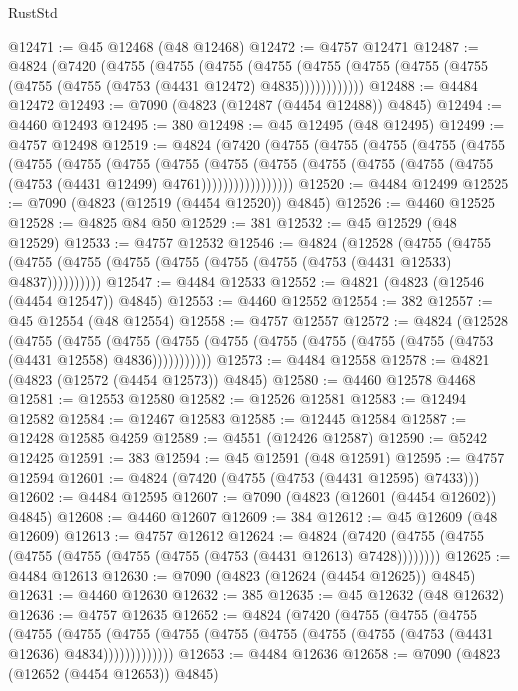 \begin{lexlean}{RustStd}
\begin{coremodule}
@12471 := @45 @12468 (@48 @12468)
@12472 := @4757 @12471
@12487 := @4824
    (@7420
      (@4755
        (@4755
          (@4755
            (@4755 (@4755 (@4755 (@4755 (@4755 (@4755 (@4755 (@4753 (@4431 @12472) @4835))))))))))))
@12488 := @4484 @12472
@12493 := @7090 (@4823 (@12487 (@4454 @12488)) @4845)
@12494 := @4460 @12493
@12495 := 380
@12498 := @45 @12495 (@48 @12495)
@12499 := @4757 @12498
@12519 := @4824
    (@7420
      (@4755
        (@4755
          (@4755
            (@4755
              (@4755
                (@4755
                  (@4755
                    (@4755
                      (@4755
                        (@4755
                          (@4755
                            (@4755 (@4755 (@4755 (@4755 (@4753 (@4431 @12499) @4761)))))))))))))))))
@12520 := @4484 @12499
@12525 := @7090 (@4823 (@12519 (@4454 @12520)) @4845)
@12526 := @4460 @12525
@12528 := @4825 @84 @50
@12529 := 381
@12532 := @45 @12529 (@48 @12529)
@12533 := @4757 @12532
@12546 := @4824
    (@12528
      (@4755 (@4755 (@4755 (@4755 (@4755 (@4755 (@4755 (@4755 (@4753 (@4431 @12533) @4837))))))))))
@12547 := @4484 @12533
@12552 := @4821 (@4823 (@12546 (@4454 @12547)) @4845)
@12553 := @4460 @12552
@12554 := 382
@12557 := @45 @12554 (@48 @12554)
@12558 := @4757 @12557
@12572 := @4824
    (@12528
      (@4755
        (@4755
          (@4755 (@4755 (@4755 (@4755 (@4755 (@4755 (@4755 (@4753 (@4431 @12558) @4836)))))))))))
@12573 := @4484 @12558
@12578 := @4821 (@4823 (@12572 (@4454 @12573)) @4845)
@12580 := @4460 @12578 @4468
@12581 := @12553 @12580
@12582 := @12526 @12581
@12583 := @12494 @12582
@12584 := @12467 @12583
@12585 := @12445 @12584
@12587 := @12428 @12585 @4259
@12589 := @4551 (@12426 @12587)
@12590 := @5242 @12425
@12591 := 383
@12594 := @45 @12591 (@48 @12591)
@12595 := @4757 @12594
@12601 := @4824 (@7420 (@4755 (@4753 (@4431 @12595) @7433)))
@12602 := @4484 @12595
@12607 := @7090 (@4823 (@12601 (@4454 @12602)) @4845)
@12608 := @4460 @12607
@12609 := 384
@12612 := @45 @12609 (@48 @12609)
@12613 := @4757 @12612
@12624 := @4824 (@7420 (@4755 (@4755 (@4755 (@4755 (@4755 (@4755 (@4753 (@4431 @12613) @7428))))))))
@12625 := @4484 @12613
@12630 := @7090 (@4823 (@12624 (@4454 @12625)) @4845)
@12631 := @4460 @12630
@12632 := 385
@12635 := @45 @12632 (@48 @12632)
@12636 := @4757 @12635
@12652 := @4824
    (@7420
      (@4755
        (@4755
          (@4755
            (@4755
              (@4755
                (@4755 (@4755 (@4755 (@4755 (@4755 (@4755 (@4753 (@4431 @12636) @4834)))))))))))))
@12653 := @4484 @12636
@12658 := @7090 (@4823 (@12652 (@4454 @12653)) @4845)

\end{coremodule}
\end{lexlean}
